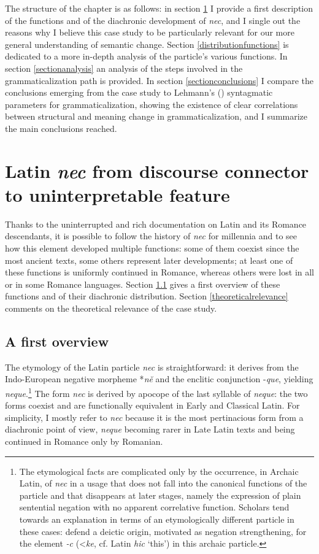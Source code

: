 \documentclass[output=paper,modfonts,nonflat,citecolor=brown,
showindex
]{langsci/langscibook}
\begin{document}
The structure of the chapter is as follows: in section \ref{generalintro} I provide a first description of the functions and of the diachronic development of {\emph{nec}}, and I single out the reasons why I believe this case study to be particularly relevant for our more general understanding of semantic change. Section \ref{distributionfunctions} is dedicated to a more in-depth analysis of the particle's various functions. In section \ref{sectionanalysis} an analysis of the steps involved in the grammaticalization path is provided. In section \ref{sectionconclusions} I compare the  conclusions emerging from the case study to Lehmann's (\citeyear{Lehmann15}) syntagmatic parameters for grammaticalization, showing the existence of clear correlations between structural and meaning change in grammaticalization, and I summarize the main conclusions reached. 

\section{Latin {\emph{nec}} from discourse connector to uninterpretable feature} \label{generalintro}

Thanks to the uninterrupted and rich documentation on Latin and its Romance descendants, it is possible to follow the history of {\emph{nec}} for millennia and to see how this element developed multiple functions: some of them coexist since the most ancient texts, some others represent later developments; at least one of these functions is uniformly continued in Romance, whereas others were lost in all or in some Romance languages. Section \ref{corefacts} gives a first overview of these functions and of their diachronic distribution. Section \ref{theoreticalrelevance} comments on the theoretical relevance of the case study.
 

\subsection{A first overview} \label{corefacts}

The etymology of the Latin particle {\emph{nec}} is straightforward: it derives from the Indo-European negative morpheme *{\emph{n\u{e}}} and the enclitic conjunction -{\emph{que}}, yielding {\emph{neque}}.{\footnote{The etymological facts are complicated only by the occurrence, in Archaic Latin, of {\emph{nec}} in a usage that does not fall into the canonical functions of the particle and that disappears at later stages, namely the expression of plain sentential negation with no apparent correlative function. Scholars tend towards an explanation in terms of an etymologically different particle in these cases: \citet[29-30]{OrlandiniPoccetti07} defend a deictic origin, motivated as negation strengthening, for the element {\emph{-c}} (\textless *{\emph{ke}}, cf. Latin {\emph{hic}} `this') in this archaic particle.}} The form {\emph{nec}} is derived by apocope of the last syllable of {\emph{neque}}: the two forms coexist and are functionally equivalent in Early and Classical Latin. For simplicity, I mostly refer to {\emph{nec}} because it is the most pertinacious form from a diachronic point of view, {\emph{neque}} becoming rarer in Late Latin texts and being continued in Romance only by Romanian.
\end{document}
